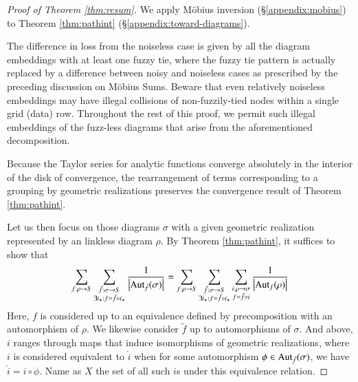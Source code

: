 \documentclass[anon,12pt]{colt2021} %
\newcommand{\wabs}[1]{\left|#1\right|}
\newcommand{\Aut}{\text{\textnormal{Aut}}}
\begin{document}
        \begin{proof}[Proof of Theorem \ref{thm:resum}]
            We apply M\"obius inversion (\S\ref{appendix:mobius}) to Theorem
            \ref{thm:pathint} (\S\ref{appendix:toward-diagrams}).

            The difference in loss from the noiseless case is given by all the
            diagram embeddings with at least one fuzzy tie, where the fuzzy tie
            pattern is actually replaced by a difference between noisy and
            noiseless cases as prescribed by the preceding discussion on
            M\"obius Sums.  Beware that even relatively noiseless embeddings
            may have illegal collisions of non-fuzzily-tied nodes within a
            single grid (data) row.  Throughout the rest of this proof, we
            permit such illegal embeddings of the fuzz-less diagrams that arise
            from the aforementioned decomposition.  

            Because the Taylor series for analytic functions converge
            absolutely in the interior of the disk of convergence, the
            rearrangement of terms corresponding to a grouping by geometric
            realizations preserves the convergence result of Theorem
            \ref{thm:pathint}.  

            Let us then focus on those diagrams $\sigma$ with a given geometric
            realization represented by an linkless diagram $\rho$.  By
            Theorem \ref{thm:pathint}, it suffices to show that
            \begin{equation} \label{eq:hard}
                \sum_{f:\rho\to S}
                \sum_{\substack{
                    \tilde f:\sigma\to S \\
                    \exists i_\star: f=\tilde f \circ i_\star
                }}
                \frac{1}{\wabs{\Aut_{\tilde f}(\sigma)}}
                =
                \sum_{f:\rho\to S}
                \sum_{\substack{
                    \tilde f:\sigma\to S \\
                    \exists i_\star: f=\tilde f \circ i_\star
                }}
                \sum_{\substack{
                    i:\rho\to\sigma \\
                    f = \tilde f \circ i
                }}
                \frac{1}{\wabs{\Aut_{f}(\rho)}}
            \end{equation}
            Here, $f$ is considered up to an equivalence defined by
            precomposition with an automorphism of $\rho$.  We likewise
            consider $\tilde f$ up to automorphisms of $\sigma$.  And above,
            $i$ ranges through maps that induce isomorphisms of geometric
            realizations, where $i$ is considered equivalent to $\hat i$ when
            for some automorphism $\phi \in \Aut_{\tilde f}(\sigma)$, we have
            $\hat i = i \circ \phi$.  Name as $X$ the set of all such $i$s
            under this equivalence relation.


\end{proof}
\end{document}

